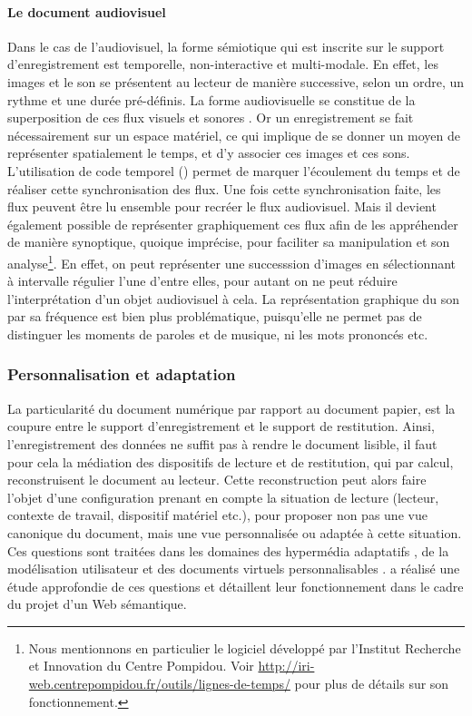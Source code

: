 \paragraph{Le document audiovisuel}
Dans le cas de l'audiovisuel, la forme sémiotique qui est inscrite sur le support d'enregistrement est temporelle, non-interactive et multi-modale.
En effet, les images et le son se présentent au lecteur de manière successive, selon un ordre, un rythme et une durée pré-définis.
La forme audiovisuelle se constitue de la superposition de ces flux visuels et sonores .
Or un enregistrement se fait nécessairement sur un espace matériel, ce qui implique de se donner un moyen de représenter spatialement le temps, et d'y associer ces images et ces sons.
L'utilisation de code temporel () permet de marquer l'écoulement du temps et de réaliser cette synchronisation des flux.
Une fois cette synchronisation faite, les flux peuvent être lu ensemble pour recréer le flux audiovisuel.
Mais il devient également possible de représenter graphiquement ces flux afin de les appréhender de manière synoptique, quoique imprécise, pour faciliter sa manipulation et son analyse\footnote{Nous mentionnons en particulier le logiciel  développé par l'Institut Recherche et Innovation du Centre Pompidou. Voir \url{http://iri-web.centrepompidou.fr/outils/lignes-de-temps/} pour plus de détails sur son fonctionnement.}. 
En effet, on peut représenter une successsion d'images en sélectionnant à intervalle régulier l'une d'entre elles, pour autant on ne peut réduire l'interprétation d'un objet audiovisuel à cela.
La représentation graphique du son par sa fréquence est bien plus problématique, puisqu'elle ne permet pas de distinguer les moments de paroles et de musique, ni les mots prononcés etc.


 \subsubsection{Personnalisation et adaptation}
La particularité du document numérique par rapport au document papier, est la coupure entre le support d'enregistrement et le support de restitution. 
Ainsi, l'enregistrement des données ne suffit pas à rendre le document lisible, il faut pour cela la médiation des dispositifs de lecture et de restitution, qui par calcul, reconstruisent le document au lecteur.
Cette reconstruction peut alors faire l'objet d'une configuration prenant en compte la situation de lecture (lecteur, contexte de travail, dispositif matériel etc.), pour proposer non pas une vue canonique du document, mais une vue personnalisée ou adaptée à cette situation.
Ces questions sont traitées dans les domaines des hypermédia adaptatifs , de la modélisation utilisateur et des documents virtuels personnalisables . \cite{Iksal2002} a réalisé une étude approfondie de ces questions et \cite{Garlatti2004} détaillent leur fonctionnement dans le cadre du projet d'un Web sémantique.


